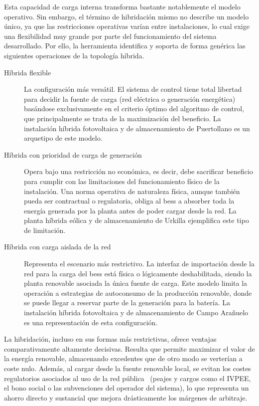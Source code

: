 Esta capacidad de carga interna transforma bastante notablemente el modelo operativo. Sin embargo, el término de hibridación mismo no describe un modelo único, ya que las restricciones operativas varían entre instalaciones, lo cual exige una flexibilidad muy grande por parte del funcionamiento del sistema desarrollado. Por ello, la herramienta identifica y soporta de forma genérica las siguientes operaciones de la topología híbrida.

\begin{description}

  \item[Híbrida flexible] La configuración más versátil. El sistema de control tiene total libertad para decidir la fuente de carga (red eléctrica o generación energética) basándose exclusivamente en el criterio óptimo del algoritmo de control, que principalmente se trata de la maximización del beneficio. La instalación híbrida fotovoltaica y de almacenamiento de Puertollano es un arquetipo de este modelo.

  \item[Híbrida con prioridad de carga de generación] Opera bajo una restricción no económica, es decir, debe sacrificar beneficio para cumplir con las limitaciones del funcionamiento físico de la instalación. Una norma operativa de naturaleza física, aunque también pueda ser contractual o regulatoria, obliga al \gls{bess} a absorber toda la energía generada por la planta antes de poder cargar desde la red. La planta híbrida eólica y de almacenamiento de Urkilla ejemplifica este tipo de limitación.

  \item[Híbrida con carga aislada de la red] Representa el escenario más restrictivo. La interfaz de importación desde la red para la carga del \gls{bess} está física o lógicamente deshabilitada, siendo la planta renovable asociada la única fuente de carga. Este modelo limita la operación a estrategias de autoconsumo de la producción renovable, donde se puede llegar a reservar parte de la generación para la batería. La instalación híbrida fotovoltaica y de almacenamiento de Campo Arañuelo es una representación de esta configuración.

\end{description}

La hibridación, incluso en sus formas más restrictivas, ofrece ventajas comparativamente altamente decisivas. Resulta que permite maximizar el valor de la energía renovable, almacenando excedentes que de otro modo se verterían a coste nulo. Además, al cargar desde la fuente renovable local, se evitan los costes regulatorios asociados al uso de la red pública~\cite{mterd2024orden} (peajes y cargos como el IVPEE, el bono social o las subvenciones del operador del sistema), lo que representa un ahorro directo y sustancial que mejora drásticamente los márgenes de arbitraje.

